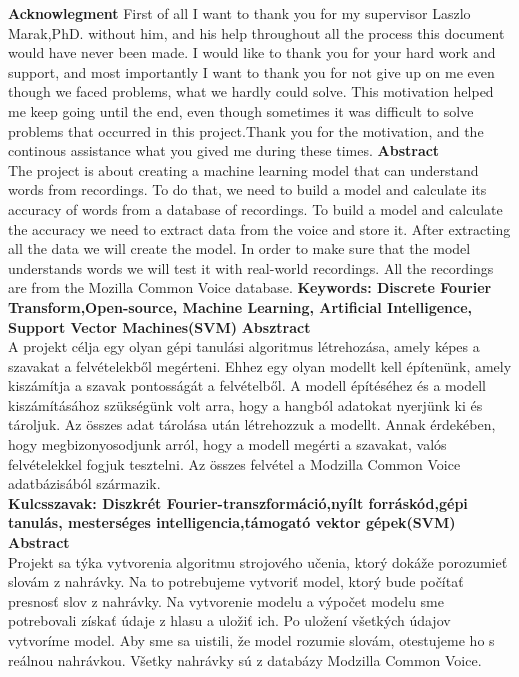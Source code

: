 \documentclass[english,12pt,oneside,a4paper]{article}
\begin{document}
	\textbf{Acknowlegment}
	\newline
	\newline
	First of all I want to thank you for my supervisor Laszlo Marak,PhD. without him, and his help throughout all the process this document would have never been made. I would like to thank you for your hard work and support, and most importantly I want to thank you for not give up on me even though we faced problems, what we hardly could solve. This motivation helped me keep going until the end, even though sometimes it was difficult to solve problems that occurred in this project.Thank you for the motivation, and the continous assistance what you gived me during these times.
	\newpage
	\textbf{Abstract}
	\\
	The project is about creating a machine learning model that can understand words from recordings. To do that, we need to build a model and calculate its accuracy of words from a database of recordings. To build a model and calculate the accuracy we need to extract data from the voice and store it. After extracting all the data we will create the model. In order to make sure that the model understands words we will test it with real-world recordings. All the recordings are from the Mozilla Common Voice database.
	\newline
	\textbf{Keywords: Discrete Fourier Transform,Open-source, Machine Learning, Artificial Intelligence, Support Vector Machines(SVM)} 
	\newpage
	\textbf{Absztract}
	\\
	A projekt célja egy olyan gépi tanulási algoritmus létrehozása, amely képes a szavakat a felvételekből megérteni. Ehhez egy olyan modellt kell építenünk, amely kiszámítja a szavak pontosságát a felvételből. A modell építéséhez és a modell kiszámításához szükségünk volt arra, hogy a hangból adatokat nyerjünk ki és tároljuk. Az összes adat tárolása után létrehozzuk a modellt. Annak érdekében, hogy megbizonyosodjunk arról, hogy a modell megérti a szavakat, valós felvételekkel fogjuk tesztelni. Az összes felvétel a Modzilla Common Voice adatbázisából származik.\\
	\textbf{Kulcsszavak: Diszkrét Fourier-transzformáció,nyílt forráskód,gépi tanulás, mesterséges intelligencia,támogató vektor gépek(SVM)} 
	\newpage
	\textbf{Abstract}
	\\
	Projekt sa týka vytvorenia algoritmu strojového učenia, ktorý dokáže porozumieť slovám z nahrávky. Na to potrebujeme vytvoriť model, ktorý bude počítať presnosť slov z nahrávky. Na vytvorenie modelu a výpočet modelu sme potrebovali získať údaje z hlasu a uložiť ich. Po uložení všetkých údajov vytvoríme model. Aby sme sa uistili, že model rozumie slovám, otestujeme ho s reálnou nahrávkou. Všetky nahrávky sú z databázy Modzilla Common Voice.\\
\end{document}
